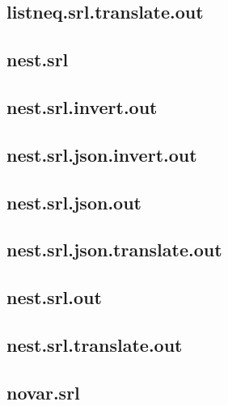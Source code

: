 \subsection{listneq.srl.translate.out}
\label{app:listneq_srl.translate.out}

\subsection{nest.srl}
\label{app:nest_srl}

\subsection{nest.srl.invert.out}
\label{app:nest_srl.invert.out}

\subsection{nest.srl.json.invert.out}
\label{app:nest_srl.json.invert.out}

\subsection{nest.srl.json.out}
\label{app:nest_srl.json.out}

\subsection{nest.srl.json.translate.out}
\label{app:nest_srl.json.translate.out}

\subsection{nest.srl.out}
\label{app:nest_srl.out}

\subsection{nest.srl.translate.out}
\label{app:nest_srl.translate.out}

\subsection{novar.srl}
\label{app:novar_srl}

